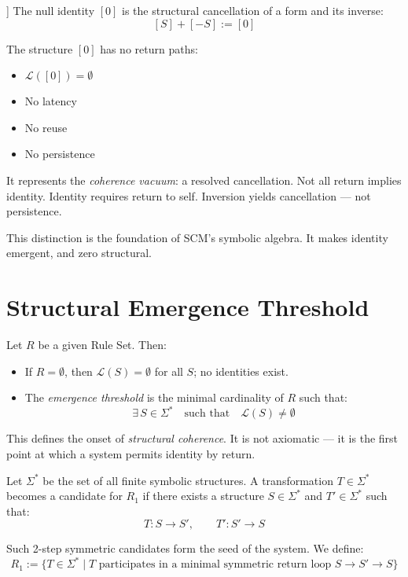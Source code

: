 \begin{definition}[Null Identity [0]] \label{def:null-identity}
The null identity $[0]$ is the structural cancellation of a form and its inverse:
\begin{equation} \label{eq:null-identity-definition}
[S] + [-S] := [0]
\end{equation}
\end{definition}

The structure $[0]$ has no return paths:
\begin{itemize}
  \item $\mathcal{L}([0]) = \emptyset$
  \item No latency
  \item No reuse
  \item No persistence
\end{itemize}

It represents the \textit{coherence vacuum}: a resolved cancellation.  
Not all return implies identity. Identity requires return to self.  
Inversion yields cancellation — not persistence.

This distinction is the foundation of SCM's symbolic algebra. It makes identity emergent, and zero structural.

\section{Structural Emergence Threshold}

Let $R$ be a given Rule Set. Then:
\begin{itemize}
  \item If $R = \emptyset$, then $\mathcal{L}(S) = \emptyset$ for all $S$; no identities exist.
  \item The \textit{emergence threshold} is the minimal cardinality of $R$ such that:
  \begin{equation} \label{eq:emergence-threshold}
  \exists\, S \in \Sigma^* \quad \text{such that} \quad \mathcal{L}(S) \neq \emptyset
  \end{equation}
\end{itemize}

This defines the onset of \textit{structural coherence}.  
It is not axiomatic — it is the first point at which a system permits identity by return.

\begin{definition} \label{def:structural-bootstrap}
Let $\Sigma^*$ be the set of all finite symbolic structures.  
A transformation $T \in \Sigma^*$ becomes a candidate for $R_1$ if there exists a structure $S \in \Sigma^*$ and $T' \in \Sigma^*$ such that:
\begin{equation} \label{eq:bootstrap-pair}
T: S \rightarrow S', \qquad T': S' \rightarrow S
\end{equation}

Such 2-step symmetric candidates form the seed of the system. We define:
\begin{equation} \label{eq:r1-bootstrap}
R_1 := \{ T \in \Sigma^* \mid T \text{ participates in a minimal symmetric return loop } S \rightarrow S' \rightarrow S \}
\end{equation}
\end{definition}

